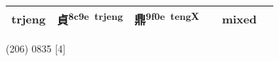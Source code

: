 \documentclass[14pt,a4paper]{scrartcl}
\begin{document}
\begin{longtable}[c]{@{}llllll@{}}
\begin{minipage}[t]{0.14\columnwidth}\raggedright\strut
trjeng
\strut\end{minipage} &
\begin{minipage}[t]{0.14\columnwidth}\raggedright\strut
貞\textsuperscript{8c9e~trjeng}
\strut\end{minipage} &
\begin{minipage}[t]{0.14\columnwidth}\raggedright\strut
鼎\textsuperscript{9f0e~tengX}
\strut\end{minipage} &
\begin{minipage}[t]{0.14\columnwidth}\raggedright\strut
\strut\end{minipage} &
\begin{minipage}[t]{0.14\columnwidth}\raggedright\strut
mixed
\strut\end{minipage}\tabularnewline
\bottomrule
\end{longtable}

(206) 0835 {[}4{]}
\end{document}
